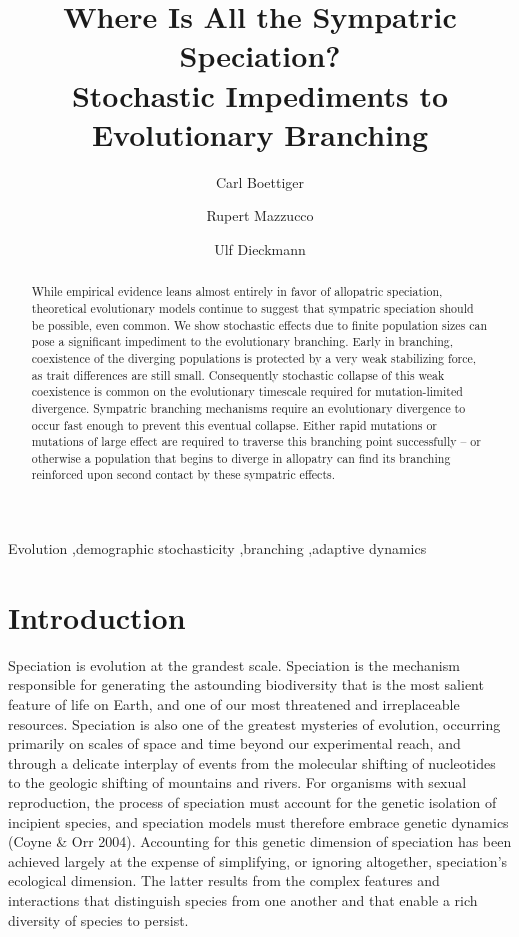 \documentclass[authoryear,review,11pt]{elsarticle}
\begin{document}
\begin{frontmatter}
\title{Where Is All the Sympatric Speciation?  \\ Stochastic Impediments to Evolutionary Branching}
\author[carl]{Carl Boettiger}
\author[rupert]{Rupert Mazzucco}
\author[ulf]{Ulf Dieckmann}
\address[carl]{Center for Population Biology, University of California, Davis, United States}
\address[rupert]{International Institute for Applied Systems Analysis, Austria}
\address[ulf]{International Institute for Applied Systems Analysis, Austria}
\begin{abstract}
While empirical evidence leans almost entirely in favor of allopatric speciation, theoretical evolutionary models continue to suggest that sympatric speciation should be possible, even common.  We show stochastic effects due to finite population sizes can pose a significant impediment to the evolutionary branching.  Early in branching, coexistence of the diverging populations is protected by a very weak stabilizing force, as trait differences are still small.  Consequently stochastic collapse of this weak coexistence is common on the evolutionary timescale required for mutation-limited divergence.  Sympatric branching mechanisms require an evolutionary divergence to occur fast enough to prevent this eventual collapse.  Either rapid mutations or mutations of large effect are required to traverse this branching point successfully – or otherwise a population that begins to diverge in allopatry can find its branching reinforced upon second contact by these sympatric effects.  
\end{abstract}
\begin{keyword}
Evolution \sep demographic stochasticity \sep branching \sep adaptive dynamics
\end{keyword}
\end{frontmatter}
\section{Introduction}
Speciation is evolution at the grandest scale. Speciation is the mechanism responsible for generating the astounding biodiversity that is the most salient feature of life on Earth, and one of our most threatened and irreplaceable resources. Speciation is also one of the greatest mysteries of evolution, occurring primarily on scales of space and time beyond our experimental reach, and through a delicate interplay of events from the molecular shifting of nucleotides to the geologic shifting of mountains and rivers. For organisms with sexual reproduction, the process of speciation must account for the genetic isolation of incipient species, and speciation models must therefore embrace genetic dynamics (Coyne \& Orr 2004). Accounting for this genetic dimension of speciation has been achieved largely at the expense of simplifying, or ignoring altogether, speciation’s ecological dimension. The latter results from the complex features and interactions that distinguish species from one another and that enable a rich diversity of species to persist.
\end{document}

